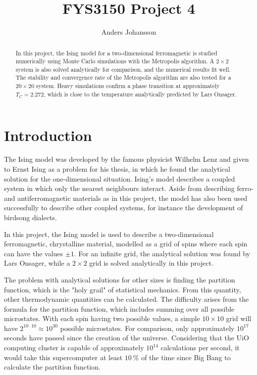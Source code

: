 \documentclass[12pt,english,a4paper]{article}
\title{FYS3150 Project 4}
\author{Anders Johansson}
\begin{document}

\pagestyle{fancy}
\tableofcontents

\begin{abstract}
In this project, the Ising model for a two-dimensional ferromagnetic is studied numerically using Monte Carlo simulations with the Metropolis algorithm. A \(2\times2\) system is also solved analytically for comparison, and the numerical results fit well. The stability and convergence rate of the Metropolis algorithm are also tested for a \(20\times20\) system. Heavy simulations confirm a phase transition at approximately \(T_C=\num{2.272}\), which is close to the temperature analytically predicted by Lars Onsager.
\end{abstract}
\clearpage


\section{Introduction}
The Ising model was developed by the famous physicist Wilhelm Lenz and given to Ernst Ising as a problem for his thesis, in which he found the analytical solution for the one-dimensional situation. Ising's model describes a coupled system in which only the nearest neighbours interact. Aside from describing ferro- and antiferromagnetic materials as in this project, the model has also been used successfully to describe other coupled systems, for instance the development of birdsong dialects\autocite{birdsong}.

In this project, the Ising model is used to describe a two-dimensional ferromagnetic, chrystalline material, modelled as a grid of spins where each spin can have the values \(\pm1\). For an infinite grid, the analytical solution was found by Lars Onsager, while a \(2\times2\) grid is solved analytically in this project.

The problem with analytical solutions for other sizes is finding the partition function, which is the "holy grail" of statistical mechanics. From this quantity, other thermodynamic quantities can be calculated. The difficulty arises from the formula for the partition function, which includes summing over all possible microstates. With each spin having two possible values, a simple \(10\times10\) grid will have \(2^{10\cdot10}\approx10^{30}\) possible microstates. For comparison, only approximately \(10^{17}\) seconds have passed since the creation of the universe. Considering that the UiO computing cluster is capable of approximately \(10^{14}\) calculations per second, it would take this supercomputer at least \(\SI{10}{\percent}\) of the time since Big Bang to calculate the partition function.
\end{document}
